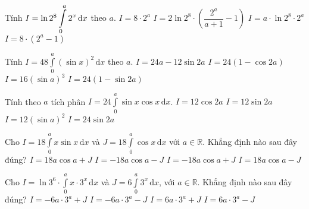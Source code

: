 \begin{ex}%
	Tính $I=\ln2^8\displaystyle\int\limits\limits_0^a 2^x\mathrm{\,d}x$ theo $a$.
	\choice
	{$I=8\cdot 2^a $}
	{$I=2\ln2^8 \cdot\left(\dfrac{2^a}{a+1}-1\right) $}
	{$I=a\cdot \ln2^8\cdot 2^a $}
	{\True $I=8\cdot (2^a-1) $}
\end{ex}

\begin{ex}%
	Tính $I=48\displaystyle\int\limits_0^a (\sin x)^2\mathrm{\,d}x$ theo $a$.
	\choice
	{\True $I=24a-12\sin2a $}
	{$I=24(1-\cos2a) $}
	{$I=16(\sin a)^3 $}
	{$I=24(1-\sin2a) $}
\end{ex}

\begin{ex}%
	Tính theo $a$ tích phân $I=24\displaystyle\int\limits_0^a \sin x\cos x\mathrm{\,d}x$.
	\choice
	{$I=12\cos2a $}
	{$I=12\sin2a $}
	{\True $I=12(\sin a)^2 $}
	{$I=24\sin2a $}
\end{ex}

\begin{ex}%
	Cho $I=18\displaystyle\int\limits_0^a x\sin x\mathrm{\,d}x$ và $J=18\displaystyle\int\limits_0^a \cos x\mathrm{\,d}x$ với $a\in \mathbb{R}$. Khẳng định nào sau đây đúng?
	\choice
	{$I=18a\cos a+J $}
	{$I=-18a\cos a-J $}
	{\True $I=-18a\cos a+J $}
	{$I=18a\cos a-J $}
\end{ex}

\begin{ex}%
	Cho $I=\ln3^6\cdot \displaystyle\int\limits_0^a x\cdot 3^x\mathrm{\,d}x$ và $J=6\displaystyle\int\limits_0^a 3^x\mathrm{\,d}x$, với $a\in\mathbb{R}$. Khẳng định nào sau đây đúng?
	\choice
	{$I=-6a\cdot 3^a +J $}
	{$I=-6a\cdot 3^a -J $}
	{$I=6a\cdot 3^a +J $}
	{\True $I=6a\cdot 3^a -J $}
\end{ex}

